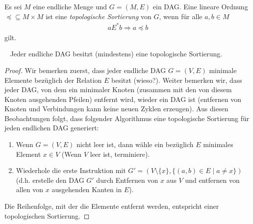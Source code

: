     \begin{df}
        Es sei $M$ eine endliche Menge und $G=(M,E)$ ein DAG. Eine lineare Ordnung $\preceq\subseteq M\times M$ ist eine \textit{topologische Sortierung} von $G$, wenn für alle $a,b\in M$
        \begin{align*}
        a E^* b  \Rightarrow a\preceq b
        \end{align*}
        gilt.
    \end{df}

    \begin{satz}~
        Jeder endliche DAG besitzt (mindestens) eine topologische Sortierung.
    \end{satz}
    \begin{proof}
        Wir bemerken zuerst, dass jeder endliche DAG $G=(V,E)$ minimale Elemente bezüglich der Relation $E$ besitzt (wieso?). Weiter bemerken wir, dass jeder DAG, von dem ein minimaler Knoten (zusammen mit den von diesem Knoten ausgehenden Pfeilen) entfernt wird, wieder ein DAG ist (entfernen von Knoten und Verbindungen kann keine neuen Zyklen erzeugen). Aus diesen Beobachtungen folgt, dass folgender Algorithmus eine topologische Sortierung für jeden endlichen DAG generiert:
        \begin{enumerate}
            \item Wenn $G=(V,E)$ nicht leer ist, dann wähle ein bezüglich $E$ minimales Element $x\in V$ (Wenn $V$ leer ist, terminiere).
            \item Wiederhole die erste Instruktion mit $G'=(V\setminus \{x\},\{(a,b)\in E\mid a\neq x \})$ (d.h. erstelle den DAG $G'$ durch Entfernen von $x$ aus $V$ und entfernen von allen von $x$ ausgehenden Kanten in $E$).
        \end{enumerate}
    Die Reihenfolge, mit der die Elemente entfernt werden, entspricht einer topologischen Sortierung.
    \end{proof}


